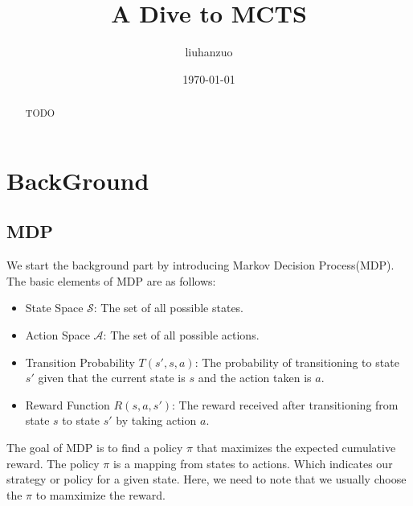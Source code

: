 \documentclass{article}
\begin{document}
\title{A Dive to MCTS}
\author{liuhanzuo}
\date{\today}
\maketitle
\begin{abstract}
    TODO
\end{abstract}
\section{BackGround}
\subsection{MDP}
We start the background part by introducing Markov Decision Process(MDP). The basic elements of MDP are as follows:
\begin{itemize}
    \item State Space $\mathcal{S}$: The set of all possible states.
    \item Action Space $\mathcal{A}$: The set of all possible actions.
    \item Transition Probability $T(s',s,a)$: The probability of transitioning to state $s'$ given that the current state is $s$ and the action taken is $a$.
    \item Reward Function $R(s,a,s')$: The reward received after transitioning from state $s$ to state $s'$ by taking action $a$.
\end{itemize}
The goal of MDP is to find a policy $\pi$ that maximizes the expected cumulative reward. The policy $\pi$ is a mapping from states to actions. Which indicates our strategy or policy for a given state. Here, we need to note that we usually choose the $\pi$ to mamximize the reward.
\end{document}
